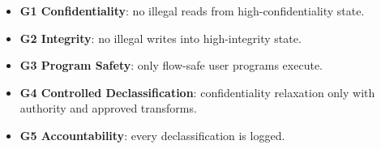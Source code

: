 \begin{itemize}
    \item \textbf{G1 Confidentiality}: no illegal reads from high-confidentiality state.
    \item \textbf{G2 Integrity}: no illegal writes into high-integrity state.
    \item \textbf{G3 Program Safety}: only flow-safe user programs execute.
    \item \textbf{G4 Controlled Declassification}: confidentiality relaxation only with authority and approved transforms.
    \item \textbf{G5 Accountability}: every declassification is logged.
\end{itemize}

